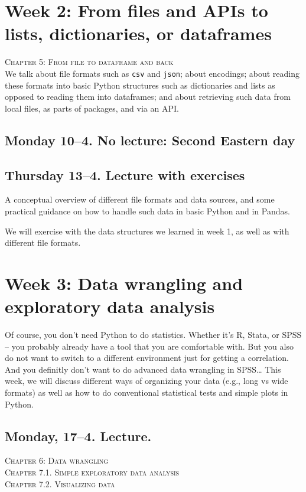 
\section*{Week 2: From files and APIs to lists, dictionaries, or dataframes}
\textsc{ Chapter 5: From file to dataframe and back}\\

We talk about file formats such as \texttt{csv} and \texttt{json}; about encodings; about reading these formats into basic Python structures such as dictionaries and lists as opposed to reading them into dataframes; and about retrieving such data from local files, as parts of packages, and via an API.

\subsection*{Monday 10--4. No lecture: Second Eastern day}

\subsection*{Thursday 13--4. Lecture with exercises}
A conceptual overview of different file formats and data sources, and some practical guidance on how to handle such data in basic Python and in Pandas.

We will exercise with the data structures we learned in week 1, as well as with different file formats.



\section*{Week 3: Data wrangling and exploratory data analysis}
Of course, you don't need Python to do statistics. Whether it's R, Stata, or SPSS -- you probably already have a tool that you are comfortable with. But you also do not want to switch to a different environment just for getting a correlation. And you definitly don't want to do advanced data wrangling in SPSS\ldots
This week, we will discuss different ways of organizing your data (e.g., long vs wide formats) as well as how to do conventional statistical tests and simple plots in Python.


\subsection*{Monday, 17--4. Lecture.}
\textsc{ Chapter 6: Data wrangling}\\
\textsc{ Chapter 7.1. Simple exploratory data analysis}\\
\textsc{ Chapter 7.2. Visualizing data}\\

